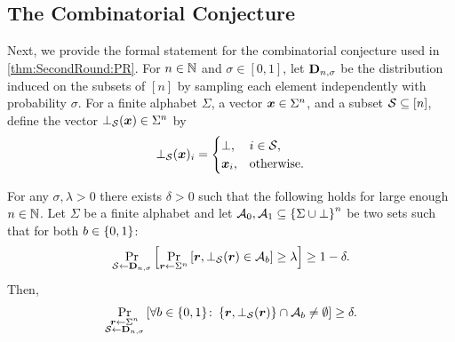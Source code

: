 

\subsection{The Combinatorial Conjecture}\label{sec:Iso}
Next, we provide the formal statement for the combinatorial conjecture used in \cref{thm:SecondRound:PR}.
For $n\in {\mathbb{N}}$ and $\sigma \in [0,1]$, let $\mathbf{D}_{n,\sigma}$ be the distribution induced on the subsets of $[n]$ by sampling each element independently with probability $\sigma$.
For a finite alphabet $\Sigma$, a vector ${ \boldsymbol{x}}\in \Sigma^n$, and a subset $\mathcal{S} \subseteq [n]$, define the vector $\bot_{\mathcal{S}}({ \boldsymbol{x}}) \in \Sigma^n$ by 
\[
\bot_{\mathcal{S}}({ \boldsymbol{x}})_i=
\begin{cases}
\bot, & i\in {\cal{S}},\\
{ \boldsymbol{x}}_i, & \text{otherwise}.
\end{cases}
\]


\begin{conjecture}\label{con:IsoBot}
For any $\sigma,\lambda >0$ there exists $\delta>0$ such that the following holds for large enough $n\in {\mathbb{N}}$. Let  $\Sigma$ be a finite alphabet and let $\mathcal{A}_0,\mathcal{A}_1 \subseteq \left\{\Sigma \cup \bot\right\}^n$  be  two  sets such that for both $b\in \{0,1\}$:
\begin{align*}%
\ppr{\cs\gets \bns}{\ppr{\vr \gets \Sigma^n}{\vr,\bot_{\cS}(\vr) \in \cA_b} \ge  \lambda } \ge 1-\delta.
\end{align*}
Then,
\begin{align*}%
\ppr{\substack{\vr\gets \Sigma^n\\ \cS \gets \bns}}{\forall b\in \zo\colon  \set{\vr,\bot_{\cS}(\vr)}  \cap \cA_b \neq \emptyset} \ge  \delta.
\end{align*}
\end{conjecture}


